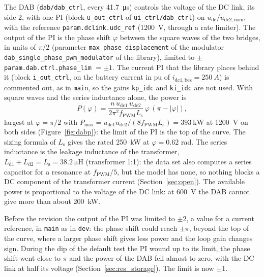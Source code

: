 \documentclass[11pt,a4paper]{scrartcl}
\newcommand{\ped}[1]{_{\mathrm{#1}}}
\newcommand{\code}[1]{\texttt{#1}}
\begin{document}
\begin{onehalfspace}
The DAB (\code{dab/dab\_ctrl}, every \SI{41.7}{\micro\second}) controls the voltage of the DC link, its side 2, with one PI (block \code{u\_out\_ctrl} of \code{ui\_ctrl/dab\_ctrl}) on $u\ped{dc}/u\ped{dc2,nom}$, with the reference \code{param.dclink.udc\_ref} (\SI{1200}{V}, through a rate limiter). The output of the PI is the phase shift $\varphi$ between the square waves of the two bridges, in units of $\pi/2$ (parameter \code{max\_phase\_displacement} of the modulator \code{dab\_single\_phase\_pwm\_modulator} of the library), limited to $\pm$\code{param.dab.ctrl.phase\_lim} $= \pm 1$. The current PI that the library places behind it (block \code{i\_out\_ctrl}, on the battery current in pu of $i\ped{dc1,bez} = \SI{250}{A}$) is commented out, as in \code{main}, so the gains \code{kp\_idc} and \code{ki\_idc} are not used. With square waves and the series inductance alone, the power is \cite{dedoncker1991}
\begin{equation}
	P(\varphi) = \frac{n\,u\ped{dc1}\,u\ped{dc2}}{2\pi^2 f\ped{PWM} L\ped{s}}\,\varphi\,(\pi - |\varphi|),
	\label{eq:dabp}
\end{equation}
largest at $\varphi = \pi/2$ with $P\ped{max} = u\ped{dc1} u\ped{dc2}/(8 f\ped{PWM} L\ped{s}) = \SI{393}{\kilo\watt}$ at \SI{1200}{V} on both sides (Figure~\ref{fig:dabp}): the limit of the PI is the top of the curve. The sizing formula of $L\ped{s}$ gives the rated \SI{250}{\kilo\watt} at $\varphi = 0.62$ rad. The series inductance is the leakage inductance of the transformer, $L\ped{d1} + L\ped{d2} = L\ped{s} = \SI{38.2}{\micro\henry}$ (transformer 1:1): the data set also computes a series capacitor for a resonance at $f\ped{PWM}/5$, but the model has none, so nothing blocks a DC component of the transformer current (Section~\ref{sec:open}). The available power is proportional to the voltage of the DC link: at \SI{600}{V} the DAB cannot give more than about \SI{200}{\kilo\watt}.

Before the revision the output of the PI was limited to $\pm 2$, a value for a current reference, in \code{main} as in \code{dev}: the phase shift could reach $\pm\pi$, beyond the top of the curve, where a larger phase shift gives less power and the loop gain changes sign. During the dip of the default test the PI wound up to its limit, the phase shift went close to $\pi$ and the power of the DAB fell almost to zero, with the DC link at half its voltage (Section~\ref{sec:res_storage}). The limit is now $\pm 1$.


\end{onehalfspace}
\end{document}
